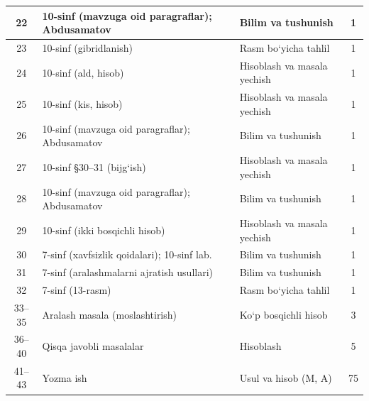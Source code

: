 \documentclass[11pt,a4paper]{article}
\begin{document}
{\begin{longtable}{|c|p{7.2cm}|p{5.4cm}|c|}
22 & 10-sinf (mavzuga oid paragraflar); Abdusamatov & Bilim va tushunish & 1\\\hline
23 & 10-sinf (gibridlanish) & Rasm bo`yicha tahlil & 1\\\hline
24 & 10-sinf (ald, hisob) & Hisoblash va masala yechish & 1\\\hline
25 & 10-sinf (kis, hisob) & Hisoblash va masala yechish & 1\\\hline
26 & 10-sinf (mavzuga oid paragraflar); Abdusamatov & Bilim va tushunish & 1\\\hline
27 & 10-sinf \S{}30--31 (bijg`ish) & Hisoblash va masala yechish & 1\\\hline
28 & 10-sinf (mavzuga oid paragraflar); Abdusamatov & Bilim va tushunish & 1\\\hline
29 & 10-sinf (ikki bosqichli hisob) & Hisoblash va masala yechish & 1\\\hline
30 & 7-sinf (xavfsizlik qoidalari); 10-sinf lab. & Bilim va tushunish & 1\\\hline
31 & 7-sinf (aralashmalarni ajratish usullari) & Bilim va tushunish & 1\\\hline
32 & 7-sinf (13-rasm) & Rasm bo`yicha tahlil & 1\\\hline
33--35 & Aralash masala (moslashtirish) & Ko`p bosqichli hisob & 3\\\hline
36--40 & Qisqa javobli masalalar & Hisoblash & 5\\\hline
41--43 & Yozma ish & Usul va hisob (M, A) & 75\\\hline
\end{longtable}}
\end{document}
